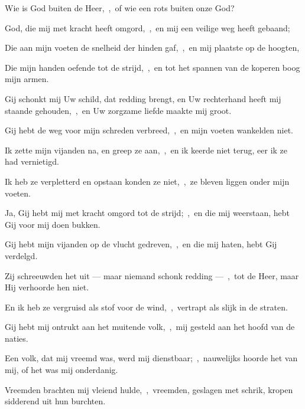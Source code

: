 \documentclass[12pt,twoside,a5paper]{article}
\begin{document}

\begin{halfparskip}
  Wie is God buiten de Heer,~\sep\ of wie een rots buiten onze God?

  God, die mij met kracht heeft omgord,~\sep\ en mij een veilige weg heeft gebaand;

  Die aan mijn voeten de snelheid der hinden gaf,~\sep\ en mij plaatste op de hoogten,

  Die mijn handen oefende tot de strijd,~\sep\ en tot het spannen van de koperen boog mijn armen.
\end{halfparskip}


\begin{halfparskip}
  Gij schonkt mij Uw schild, dat redding brengt, en Uw rechterhand heeft mij staande gehouden,~\sep\ en Uw zorgzame liefde maakte mij groot.

  Gij hebt de weg voor mijn schreden verbreed,~\sep\ en mijn voeten wankelden niet.

  Ik zette mijn vijanden na, en greep ze aan,~\sep\ en ik keerde niet terug, eer ik ze had vernietigd.

  Ik heb ze verpletterd en opstaan konden ze niet,~\sep\ ze bleven liggen onder mijn voeten.

  Ja, Gij hebt mij met kracht omgord tot de strijd;~\sep\ en die mij weerstaan, hebt Gij voor mij doen bukken.

  Gij hebt mijn vijanden op de vlucht gedreven,~\sep\ en die mij haten, hebt Gij verdelgd.

  Zij schreeuwden het uit --- maar niemand schonk redding ---~\sep\ tot de Heer, maar Hij verhoorde hen niet.

  En ik heb ze vergruisd als stof voor de wind,~\sep\ vertrapt als slijk in de straten.

  Gij hebt mij ontrukt aan het muitende volk,~\sep\ mij gesteld aan het hoofd van de naties.

  Een volk, dat mij vreemd was, werd mij dienstbaar;~\sep\ nauwelijks hoorde het van mij, of het was mij onderdanig.

  Vreemden brachten mij vleiend hulde,~\sep\ vreemden, geslagen met schrik, kropen sidderend uit hun burchten.
\end{halfparskip}

\end{document}
